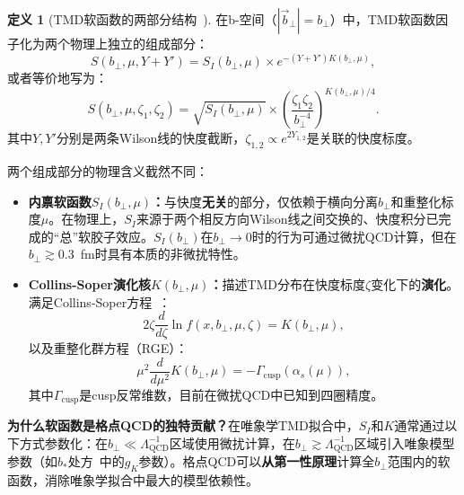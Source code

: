 \documentclass[12pt,a4paper]{ctexart}
\theoremstyle{definition}
\newtheorem{definition}{定义}[section]
\begin{document}
\begin{definition}[TMD软函数的两部分结构~\cite{LPC2020soft,Chu2023soft}]
在b-空间（$|\vec{b}_\perp| = b_\perp$）中，TMD软函数因子化为两个物理上独立的组成部分：
\begin{equation}
\boxed{S(b_\perp, \mu, Y+Y') = S_I(b_\perp, \mu) \times e^{-(Y+Y')K(b_\perp,\mu)}},
\label{eq:soft_structure}
\end{equation}
或者等价地写为：
\begin{equation}
S(b_\perp, \mu, \zeta_1, \zeta_2) = \sqrt{S_I(b_\perp, \mu)} \times \left(\frac{\zeta_1\zeta_2}{b_\perp^{-4}}\right)^{K(b_\perp,\mu)/4}.
\label{eq:soft_structure_zeta}
\end{equation}
其中$Y, Y'$分别是两条Wilson线的快度截断，$\zeta_{1,2} \propto e^{2Y_{1,2}}$是关联的快度标度。

两个组成部分的物理含义截然不同：
\begin{itemize}
    \item \textbf{内禀软函数$S_I(b_\perp,\mu)$：}与快度\textbf{无关}的部分，仅依赖于横向分离$b_\perp$和重整化标度$\mu$。在物理上，$S_I$来源于两个相反方向Wilson线之间交换的、快度积分已完成的``总''软胶子效应。$S_I(b_\perp)$在$b_\perp \to 0$时的行为可通过微扰QCD计算，但在$b_\perp \gtrsim 0.3$~fm时具有本质的非微扰特性。

    \item \textbf{Collins-Soper演化核$K(b_\perp,\mu)$：}描述TMD分布在快度标度$\zeta$变化下的\textbf{演化}。满足Collins-Soper方程~\cite{Collins2011foundations}：
    \begin{equation}
    2\zeta \frac{d}{d\zeta} \ln f(x, b_\perp, \mu, \zeta) = K(b_\perp, \mu),
    \label{eq:CS_equation}
    \end{equation}
    以及重整化群方程（RGE）：
    \begin{equation}
    \mu^2 \frac{d}{d\mu^2} K(b_\perp, \mu) = -\Gamma_{\text{cusp}}(\alpha_s(\mu)),
    \label{eq:K_RGE}
    \end{equation}
    其中$\Gamma_{\text{cusp}}$是cusp反常维数，目前在微扰QCD中已知到四圈精度。
\end{itemize}
\end{definition}

\textbf{为什么软函数是格点QCD的独特贡献？}在唯象学TMD拟合中，$S_I$和$K$通常通过以下方式参数化：在$b_\perp \ll \Lambda_{\text{QCD}}^{-1}$区域使用微扰计算，在$b_\perp \gtrsim \Lambda_{\text{QCD}}^{-1}$区域引入唯象模型参数（如$b_*$处方~\cite{Collins2011foundations}中的$g_K$参数）。格点QCD可以\textbf{从第一性原理}计算全$b_\perp$范围内的软函数，消除唯象学拟合中最大的模型依赖性。
\end{document}
